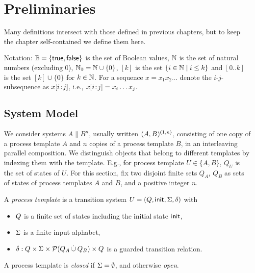 \section{Preliminaries} \label{gua:sec:prelim}\label{gua:sec:definitions}
Many definitions intersect with those defined in previous chapters,
but to keep the chapter self-contained we define them here.

Notation:
$\mathbb{B} = \{\textsf{true},\textsf{false}\}$ is the set of Boolean values,
$\mathbb{N}$ is the set of natural numbers (excluding $0$),
$\mathbb{N}_0 = \mathbb{N}\cup\{0\}$,
$[k]$ is the set $\{i \in \mathbb{N} \mid i \leq k\}$
and $[0..k]$ is the set $[k] \cup \{0\}$ for $k \in \mathbb{N}$.
For a sequence $x=x_1x_2\ldots$ denote the $i$-$j$-subsequence as $x[{i}\!:\!{j}]$,
i.e., ${x[{i}\!:\!{j}]}=x_i \ldots x_j$.


\subsection{System Model} \label{gua:sec:model}

We consider systems $A {\parallel} B^n$, usually written $(A,B)^{(1,n)}$, 
consisting of
one copy of a process template $A$ and $n$ copies of a process template $B$,
in an interleaving parallel composition.%
We distinguish objects that belong to different templates by indexing them with
the template. E.g., for process template $U \in \{A,B\}$, $Q_U$ is the set of
states of $U$. For this section, fix two disjoint finite sets $Q_A$, $Q_B$ as
sets of states of process templates $A$ and $B$, and a positive integer $n$.

 A \emph{process template} 
 is a transition system
  $U=(\stateset, \init, \inputs, \delta)$ with 
	\begin{itemize}
	\item $\stateset$ is a finite set of states including the
  initial state ${\sf init}$,
	\item $\Sigma$ is a finite input alphabet,
	\item $\delta: \stateset \times \inputs \times \mP(Q_A \cupdot Q_B) \times \stateset$ is a guarded transition relation.
	\end{itemize}
A process template is \emph{closed} if $\Sigma = \emptyset$, and otherwise \emph{open}.

